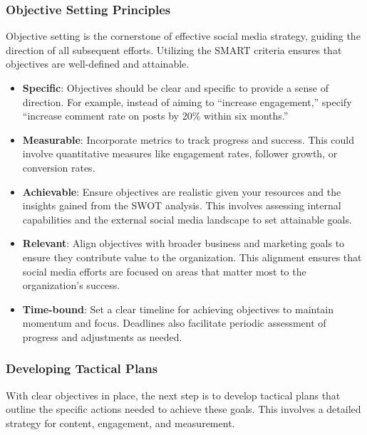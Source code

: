 \documentclass[
]{book}
\providecommand{\tightlist}{%
  \setlength{\itemsep}{0pt}\setlength{\parskip}{0pt}}
\begin{document}
\hypertarget{objective-setting-principles}{%
\subsubsection{Objective Setting Principles}\label{objective-setting-principles}}

Objective setting is the cornerstone of effective social media strategy, guiding the direction of all subsequent efforts. Utilizing the SMART criteria ensures that objectives are well-defined and attainable.

\begin{itemize}
\tightlist
\item
  \textbf{Specific}: Objectives should be clear and specific to provide a sense of direction. For example, instead of aiming to ``increase engagement,'' specify ``increase comment rate on posts by 20\% within six months.''
\item
  \textbf{Measurable}: Incorporate metrics to track progress and success. This could involve quantitative measures like engagement rates, follower growth, or conversion rates.
\item
  \textbf{Achievable}: Ensure objectives are realistic given your resources and the insights gained from the SWOT analysis. This involves assessing internal capabilities and the external social media landscape to set attainable goals.
\item
  \textbf{Relevant}: Align objectives with broader business and marketing goals to ensure they contribute value to the organization. This alignment ensures that social media efforts are focused on areas that matter most to the organization's success.
\item
  \textbf{Time-bound}: Set a clear timeline for achieving objectives to maintain momentum and focus. Deadlines also facilitate periodic assessment of progress and adjustments as needed.
\end{itemize}

\hypertarget{developing-tactical-plans}{%
\subsubsection{Developing Tactical Plans}\label{developing-tactical-plans}}

With clear objectives in place, the next step is to develop tactical plans that outline the specific actions needed to achieve these goals. This involves a detailed strategy for content, engagement, and measurement.
\end{document}
